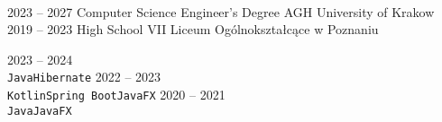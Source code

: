 \documentclass[9pt]{developercv} %
\begin{document}

\begin{minipage}[t]{0.4\textwidth} %
	\vspace{-\baselineskip} %
	
	\lorem \lorem \lorem \lorem \lorem\\ %
\end{minipage}
\hfill %
\begin{minipage}[t]{0.5\textwidth} %
	\vspace{-\baselineskip} %
	\begin{barchart}{5.5}
	\end{barchart}
\end{minipage}




\begin{entrylist}
	\entry
		{2023 -- 2027}
		{Computer Science Engineer's Degree}
		{AGH University of Krakow}
		{\lorem\lorem}
      \entry
		{2019 -- 2023}
		{High School}
		{VII Liceum Ogólnokształcące w Poznaniu}
		{\lorem\lorem}
\end{entrylist}


\begin{entrylist}
    \entry
		{2023 -- 2024}
		{\lorem}
		{}
		{\lorem \lorem \lorem\\ \texttt{Java}\slashsep\texttt{Hibernate}}
	\entry
		{2022 -- 2023}
		{\lorem}
		{}
		{\lorem \lorem \lorem\\ \texttt{Kotlin}\slashsep\texttt{Spring Boot}\slashsep\texttt{JavaFX}}
	\entry
		{2020 -- 2021}
		{\lorem}
		{}
		{\lorem \lorem \lorem\\ \texttt{Java}\slashsep\texttt{JavaFX}}
\end{entrylist}
\end{document}
